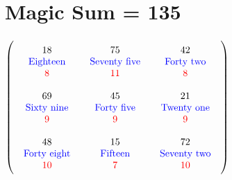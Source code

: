 \documentclass{article}
\begin{document}
\vspace{2em} 
\section{Magic Sum = 135}$ \left( \begin{array}{ccc}
\begin{array}{c}
\rule{0pt}{1.5em}18 \\ 
\text{\color{blue}Eighteen} \\ 
\color{red}8 \vspace{.5em} 
\end{array} & \begin{array}{c}
\rule{0pt}{1.5em}75 \\ 
\text{\color{blue}Seventy five} \\ 
\color{red}11 \vspace{.5em} 
\end{array} & \begin{array}{c}
\rule{0pt}{1.5em}42 \\ 
\text{\color{blue}Forty two} \\ 
\color{red}8 \vspace{.5em} 
\end{array}\\ 
\begin{array}{c}
\rule{0pt}{1.5em}69 \\ 
\text{\color{blue}Sixty nine} \\ 
\color{red}9 \vspace{.5em} 
\end{array} & \begin{array}{c}
\rule{0pt}{1.5em}45 \\ 
\text{\color{blue}Forty five} \\ 
\color{red}9 \vspace{.5em} 
\end{array} & \begin{array}{c}
\rule{0pt}{1.5em}21 \\ 
\text{\color{blue}Twenty one} \\ 
\color{red}9 \vspace{.5em} 
\end{array}\\ 
\begin{array}{c}
\rule{0pt}{1.5em}48 \\ 
\text{\color{blue}Forty eight} \\ 
\color{red}10 \vspace{.5em} 
\end{array} & \begin{array}{c}
\rule{0pt}{1.5em}15 \\ 
\text{\color{blue}Fifteen} \\ 
\color{red}7 \vspace{.5em} 
\end{array} & \begin{array}{c}
\rule{0pt}{1.5em}72 \\ 
\text{\color{blue}Seventy two} \\ 
\color{red}10 \vspace{.5em} 
\end{array}\end{array} \right) $
\end{document}
